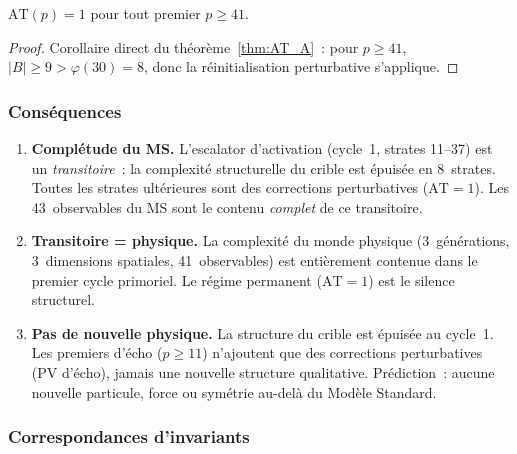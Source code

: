 \documentclass[12pt,a4paper]{article}
\begin{document}
\begin{corollaire}
\label{cor:PMPT}
$\mathrm{AT}(p) = 1$ pour tout premier $p \ge 41$.
\end{corollaire}

\begin{proof}
Corollaire direct du théorème~\ref{thm:AT_A}~: pour $p \ge 41$,
$|B| \ge 9 > \varphi(30) = 8$, donc la réinitialisation perturbative
s'applique.
\end{proof}

\subsubsection{Conséquences}

\begin{enumerate}[nosep]
  \item \textbf{Complétude du MS.} L'escalator d'activation (cycle~1,
    strates 11--37) est un \emph{transitoire}~: la complexité
    structurelle du crible est épuisée en 8~strates. Toutes les
    strates ultérieures sont des corrections perturbatives
    ($\mathrm{AT} = 1$). Les 43~observables du MS sont le contenu
    \emph{complet} de ce transitoire.

  \item \textbf{Transitoire = physique.} La complexité du monde
    physique (3~générations, 3~dimensions spatiales, 41~observables)
    est entièrement contenue dans le premier cycle primoriel. Le
    régime permanent ($\mathrm{AT} = 1$) est le silence structurel.

  \item \textbf{Pas de nouvelle physique.} La structure du crible est
    épuisée au cycle~1. Les premiers d'écho ($p \ge 11$) n'ajoutent
    que des corrections perturbatives (PV d'écho), jamais une
    nouvelle structure qualitative. Prédiction~: aucune nouvelle
    particule, force ou symétrie au-delà du Modèle Standard.
\end{enumerate}

\subsubsection{Correspondances d'invariants}
\end{document}
